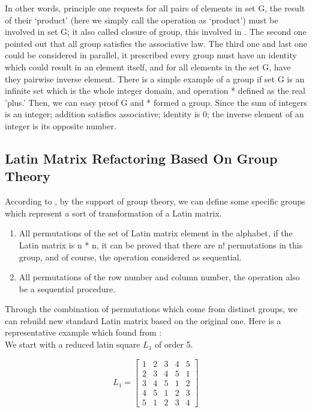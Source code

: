 \documentclass[12pt]{article}
\begin{document}
In other words, principle one requests for all pairs of elements in set G, the result of their ‘product’ (here we simply call the operation as ‘product') must be involved in set G; it also called closure of group, this involved in \cite{ref2}. The second one pointed out that all group satisfies the associative law. The third one and last one could be considered in parallel, it prescribed every group must have an identity which could result in an element itself, and for all elements in the set G, have they pairwise inverse element. There is a simple example of a group if set G is an infinite set which is the whole integer domain, and operation * defined as the real 'plus.' Then, we can easy proof G and * formed a group. Since the sum of integers is an integer; addition satisfies associative; identity is 0; the inverse element of an integer is its opposite number. 



\subsection{Latin Matrix Refactoring Based On Group Theory}

According to \cite{ref1}, by the support of group theory, we can define some specific groups which represent a sort of transformation of a Latin matrix.


\begin{enumerate}[1.]
\item All permutations of the set of Latin matrix element in the alphabet, if the Latin matrix is n * n, it can be proved that there are n! permutations in this group, and of course, the operation considered as sequential.
\item All permutations of the row number and column number, the operation also be a sequential procedure.
\end{enumerate}


Through the combination of permutations which come from distinct groups, we can rebuild new standard Latin matrix based on the original one. Here is a representative example which found from \cite{ref1}:\\
We start with a reduced latin square $L_1$ of order 5.


\[ L_1 = \begin{bmatrix} 1 & 2 & 3 & 4 & 5\\2 & 3 & 4 & 5 & 1\\3 & 4 & 5 & 1 & 2\\
                         4 & 5 & 1 & 2 & 3\\5 & 1 & 2 & 3 & 4 \end{bmatrix} \]
\end{document}
